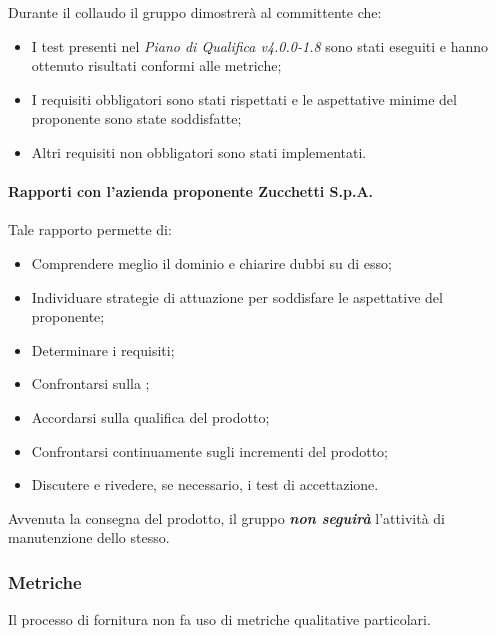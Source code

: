 Durante il collaudo il gruppo dimostrerà al committente che:
\begin{itemize}
	\item I test presenti nel \textit{Piano di Qualifica v4.0.0-1.8} sono stati eseguiti e hanno ottenuto risultati conformi alle metriche;
	\item I requisiti obbligatori sono stati rispettati e le aspettative minime del proponente sono state soddisfatte;
	\item Altri requisiti non obbligatori sono stati implementati.
\end{itemize}

\paragraph{Rapporti con l’azienda proponente Zucchetti S.p.A.}
Tale rapporto permette di:
\begin{itemize}
	\item Comprendere meglio il dominio e chiarire dubbi su di esso;
	\item Individuare strategie di attuazione per soddisfare le aspettative del proponente;
	\item Determinare i requisiti;
	\item Confrontarsi sulla ;
	\item Accordarsi sulla qualifica del prodotto;
	\item Confrontarsi continuamente sugli incrementi del prodotto;
	\item Discutere e rivedere, se necessario, i test di accettazione.
\end{itemize}
Avvenuta la consegna del prodotto, il gruppo \textit{\textbf{non seguirà}} l'attività di manutenzione dello stesso.

\subsubsection{Metriche}
Il processo di fornitura non fa uso di metriche qualitative particolari.

